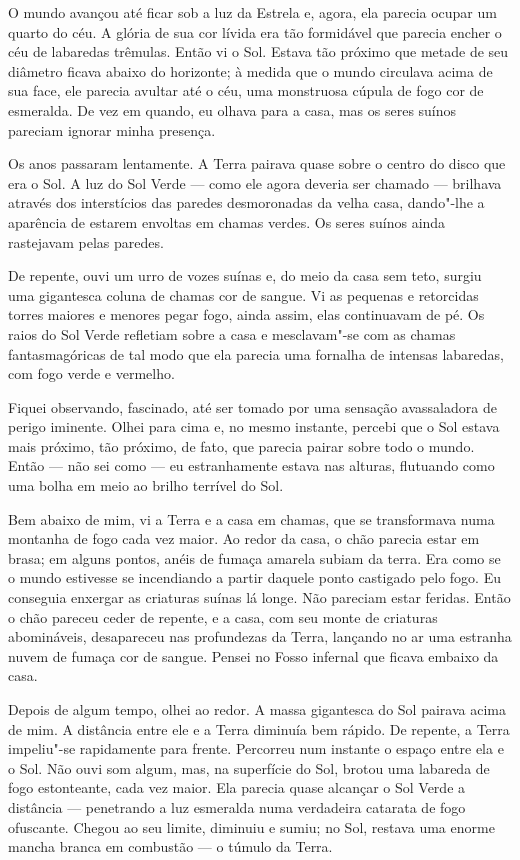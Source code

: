 O mundo avançou até ficar sob a luz da Estrela e, agora, ela parecia ocupar um quarto do céu. A glória de sua cor
lívida era tão formidável que parecia encher o céu de labaredas trêmulas. Então vi o Sol. Estava tão próximo que
metade de seu diâmetro ficava abaixo do horizonte; à medida que o mundo circulava acima de sua face, ele parecia
avultar até o céu, uma monstruosa cúpula de fogo cor de esmeralda. De vez em quando, eu olhava para a casa, mas os
seres suínos pareciam ignorar minha presença.

Os anos passaram lentamente. A Terra pairava quase sobre o centro do disco que era o Sol. A luz do Sol Verde --- como
ele agora deveria ser chamado --- brilhava através dos interstícios das paredes desmoronadas da velha casa, dando"-lhe a
aparência de estarem envoltas em chamas verdes. Os seres suínos ainda rastejavam pelas paredes.

De repente, ouvi um urro de vozes suínas e, do meio da casa sem teto, surgiu uma gigantesca coluna de chamas cor de
sangue. Vi as pequenas e retorcidas torres maiores e menores pegar fogo, ainda assim, elas continuavam de pé. Os
raios do Sol Verde refletiam sobre a casa e mesclavam"-se com as chamas fantasmagóricas de tal modo que ela parecia uma
fornalha de intensas labaredas, com fogo verde e vermelho.

Fiquei observando, fascinado, até ser tomado por uma sensação avassaladora de perigo iminente. Olhei para cima e, no
mesmo instante, percebi que o Sol estava mais próximo, tão próximo, de fato, que parecia pairar sobre todo o mundo.
Então --- não sei como --- eu estranhamente estava nas alturas, flutuando como uma bolha em meio ao brilho terrível do Sol.

Bem abaixo de mim, vi a Terra e a casa em chamas, que se transformava numa montanha de fogo cada vez maior. Ao redor da
casa, o chão parecia estar em brasa; em alguns pontos, anéis de fumaça amarela subiam da terra. Era como se o mundo
estivesse se incendiando a partir daquele ponto castigado pelo fogo. Eu conseguia enxergar as criaturas suínas lá
longe. Não pareciam estar feridas. Então o chão pareceu ceder de repente, e a casa, com seu monte de criaturas
abomináveis, desapareceu nas profundezas da Terra, lançando no ar uma estranha nuvem de fumaça cor de sangue. Pensei no
Fosso infernal que ficava embaixo da casa.

Depois de algum tempo, olhei ao redor. A massa gigantesca do Sol pairava acima de mim. A distância entre ele e a Terra
diminuía bem rápido. De repente, a Terra impeliu"-se rapidamente para frente. Percorreu num instante o espaço entre
ela e o Sol. Não ouvi som algum, mas, na superfície do Sol, brotou uma labareda de fogo estonteante, cada vez maior.
Ela parecia quase alcançar o Sol Verde a distância --- penetrando a luz esmeralda numa verdadeira catarata de fogo
ofuscante. Chegou ao seu limite, diminuiu e sumiu; no Sol, restava uma enorme mancha branca em combustão --- o túmulo
da Terra. 

